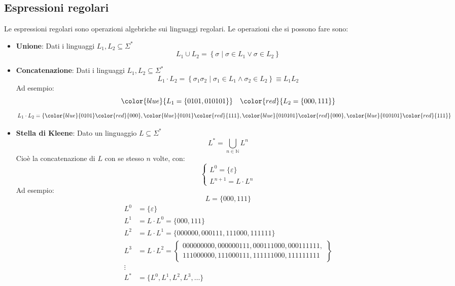 \documentclass[a4paper]{article}
\begin{document}
\subsection{Espressioni regolari}
Le espressioni regolari sono operazioni algebriche sui linguaggi regolari.
Le operazioni che si possono fare sono:
\begin{itemize}
  \item \textbf{Unione}: Dati i linguaggi \( L_1, L_2 \subseteq \Sigma^* \) 
    \[
      L_1 \cup L_2 = \left\{ \sigma \;\left|\; \sigma \in L_1 \vee \sigma \in L_2 \right. \right\}
    \] 

  \item \textbf{Concatenazione}: Dati i linguaggi \( L_1, L_2 \subseteq \Sigma^* \) 
    \[
      L_1 \cdot L_2 = \left\{ \sigma_1\sigma_2 \;\left|\; \sigma_1 \in L_1 \wedge \sigma_2 \in L_2 \right. \right\}
      \equiv L_1 L_2
    \]
    Ad esempio:
    \[
      \color{blue}{L_1 = \{0101, 010101\}}
      \quad 
      \color{red}{L_2 = \{000, 111\}}
    \] 
    \[
      L_1 \cdot L_2 = \{\color{blue}{0101}\color{red}{000},
        \color{blue}{0101}\color{red}{111},
        \color{blue}{010101}\color{red}{000},
        \color{blue}{010101}\color{red}{111}
      \}
    \] 

  \item \textbf{Stella di Kleene}: Dato un linguaggio \( L \subseteq \Sigma^* \)
    \[
      L^* = \bigcup_{n \in \mathbb{N}} L^n
    \] 
    Cioè la concatenazione di \( L \) con se stesso \( n \) volte, con:
    \[
      \begin{cases}
        L^0 = \{\varepsilon\}\\
        L^{n+1} = L \cdot L^n
      \end{cases}
    \] 
    Ad esempio:
    \[
      L = \{000, 111\} 
    \] 
    \[
      \begin{aligned}
        L^0 &= \{\varepsilon\}\\
        L^1 &= L \cdot L^0 = \{000, 111\}\\
        L^2 &= L \cdot L^1 = \{000000, 000111, 111000, 111111\}\\
        L^3 &= L \cdot L^2 = \left\{\begin{array}{l}
          000000000, 000000111, 000111000, 000111111,\\
          111000000, 111000111, 111111000, 111111111
        \end{array}\right\}\\
        \vdots\\
        L^* &= \{L^0, L^1, L^2, L^3, \ldots\}\\
      \end{aligned}
    \] 


\end{itemize}
\end{document}
